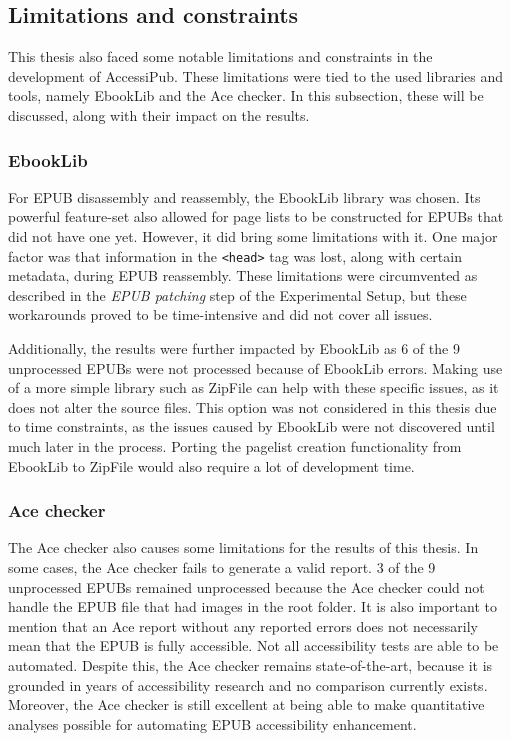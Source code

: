 \subsection{Limitations and constraints}
This thesis also faced some notable limitations and constraints in the development of AccessiPub. These limitations were tied to the used libraries and tools, namely EbookLib and the Ace checker. In this subsection, these will be discussed, along with their impact on the results.

\subsubsection{EbookLib}
For EPUB disassembly and reassembly, the EbookLib library was chosen. Its powerful feature-set also allowed for page lists to be constructed for EPUBs that did not have one yet. However, it did bring some limitations with it. One major factor was that information in the \texttt{<head>} tag was lost, along with certain metadata, during EPUB reassembly. These limitations were circumvented as described in the \textit{EPUB patching} step of the Experimental Setup, but these workarounds proved to be time-intensive and did not cover all issues.

Additionally, the results were further impacted by EbookLib as 6 of the 9 unprocessed EPUBs were not processed because of EbookLib errors. Making use of a more simple library such as ZipFile can help with these specific issues, as it does not alter the source files. This option was not considered in this thesis due to time constraints, as the issues caused by EbookLib were not discovered until much later in the process. Porting the pagelist creation functionality from EbookLib to ZipFile would also require a lot of development time.

\subsubsection{Ace checker}
The Ace checker also causes some limitations for the results of this thesis. In some cases, the Ace checker fails to generate a valid report. 3 of the 9 unprocessed EPUBs remained unprocessed because the Ace checker could not handle the EPUB file that had images in the root folder. It is also important to mention that an Ace report without any reported errors does not necessarily mean that the EPUB is fully accessible. Not all accessibility tests are able to be automated. Despite this, the Ace checker remains state-of-the-art, because it is grounded in years of accessibility research and no comparison currently exists. Moreover, the Ace checker is still excellent at being able to make quantitative analyses possible for automating EPUB accessibility enhancement.